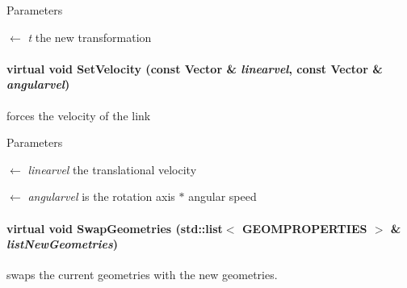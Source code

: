\begin{DoxyParams}{Parameters}
\item[\mbox{$\leftarrow$} {\em t}]the new transformation \end{DoxyParams}
\hypertarget{classOpenRAVE_1_1KinBody_1_1Link_a259dd9e4a7286a0fe86197b4206166f8}{
\paragraph[{SetVelocity}]{\setlength{\rightskip}{0pt plus 5cm}virtual void SetVelocity (const Vector \& {\em linearvel}, \/  const Vector \& {\em angularvel})}\hfill}
\label{classOpenRAVE_1_1KinBody_1_1Link_a259dd9e4a7286a0fe86197b4206166f8}
forces the velocity of the link 
\begin{DoxyParams}{Parameters}
\item[\mbox{$\leftarrow$} {\em linearvel}]the translational velocity \item[\mbox{$\leftarrow$} {\em angularvel}]is the rotation axis $\ast$ angular speed \end{DoxyParams}
\hypertarget{classOpenRAVE_1_1KinBody_1_1Link_ad4297527ddd151a0e0a03d86bf16f35e}{
\paragraph[{SwapGeometries}]{\setlength{\rightskip}{0pt plus 5cm}virtual void SwapGeometries (std::list$<$ {\bf GEOMPROPERTIES} $>$ \& {\em listNewGeometries})}\hfill}
\label{classOpenRAVE_1_1KinBody_1_1Link_ad4297527ddd151a0e0a03d86bf16f35e}


swaps the current geometries with the new geometries. 

